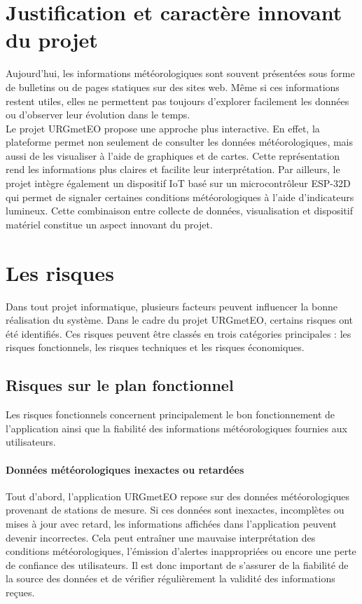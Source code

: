 \section{Justification et caractère innovant du projet}

Aujourd’hui, les informations météorologiques sont souvent présentées sous forme de bulletins ou de pages statiques sur des sites web. Même si ces informations restent utiles, elles ne permettent pas toujours d’explorer facilement les données ou d’observer leur évolution dans le temps.\\

\noindent Le projet URGmetEO propose une approche plus interactive. En effet, la plateforme permet non seulement de consulter les données météorologiques, mais aussi de les visualiser à l’aide de graphiques et de cartes. Cette représentation rend les informations plus claires et facilite leur interprétation. Par ailleurs, le projet intègre également un dispositif IoT basé sur un microcontrôleur ESP-32D qui permet de signaler certaines conditions météorologiques à l’aide d’indicateurs lumineux. Cette combinaison entre collecte de données, visualisation et dispositif matériel constitue un aspect innovant du projet.

 \section{Les risques}
 Dans tout projet informatique, plusieurs facteurs peuvent influencer la bonne réalisation du système. Dans le cadre du projet URGmetEO, certains risques ont été identifiés. Ces risques peuvent être classés en trois catégories principales : les risques fonctionnels, les risques techniques et les risques économiques.
 
 \subsection{Risques sur le plan fonctionnel}

Les risques fonctionnels concernent principalement le bon fonctionnement de l’application ainsi que la fiabilité des informations météorologiques fournies aux utilisateurs.

\paragraph{Données météorologiques inexactes ou retardées}

Tout d’abord, l’application URGmetEO repose sur des données météorologiques provenant de stations de mesure. Si ces données sont inexactes, incomplètes ou mises à jour avec retard, les informations affichées dans l’application peuvent devenir incorrectes. Cela peut entraîner une mauvaise interprétation des conditions météorologiques, l’émission d’alertes inappropriées ou encore une perte de confiance des utilisateurs. Il est donc important de s’assurer de la fiabilité de la source des données et de vérifier régulièrement la validité des informations reçues.

